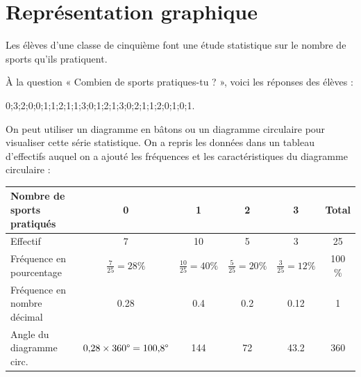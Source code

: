 \documentclass[12pt,a4paper]{article}
\begin{document}
\section{Représentation graphique}



\begin{myex}
	
	Les élèves d'une classe de cinquième font une étude statistique sur le nombre de sports qu’ils pratiquent.
	
	À la question «  Combien de sports pratiques-tu ? », voici les réponses des élèves :
	
	\begin{center}
		0;3;2;0;0;1;1;2;1;1;3;0;1;2;1;3;0;2;1;1;2;0;1;0;1.
	\end{center}

	On peut utiliser un diagramme en bâtons ou un diagramme circulaire pour visualiser cette série statistique.
	On a repris les données dans un tableau d’effectifs auquel on a ajouté les fréquences et les caractéristiques du diagramme circulaire :


	\begin{tabular}{|@{\ }l@{\ }|@{\ }c@{\ }|@{\ }c@{\ }|@{\ }c@{\ }|@{\ }c@{\ }|@{\ }c@{\ }|}
		\hline
		Nombre de sports pratiqués    & 0                                                   & 1                      & 2                     & 3                     & Total      \\ \hline
		Effectif                      & 7                                                   & 10                     & 5                     & 3                     & 25         \\ \hline
		Fréquence en pourcentage      & $\frac{7}{25}=28 \% $                               & $\frac{10}{25}=40 \% $ & $\frac{5}{25}=20 \% $ & $\frac{3}{25}=12 \% $ & 100 \%     \\ \hline
		Fréquence en nombre décimal   & \num{0.28}                                          & \num{0.4}              & \num{0.2}             & \num{0.12}            & 1          \\ \hline
		Angle du diagramme circ.      & $\num{0.28} \times 360\degree = \num{100.8}\degree$ & 144\degree             & 72\degree             & \num{43.2}\degree     & 360\degree \\ \hline
	\end{tabular}
	

\end{myex}
\end{document}
